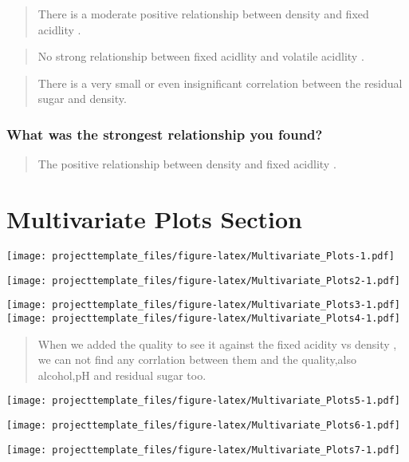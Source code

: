 \documentclass[]{article}
\begin{document}
\begin{quote}
There is a moderate positive relationship between density and fixed
acidlity .
\end{quote}

\begin{quote}
No strong relationship between fixed acidlity and volatile acidlity .
\end{quote}

\begin{quote}
There is a very small or even insignificant correlation between the
residual sugar and density.
\end{quote}

\subsubsection{What was the strongest relationship you
found?}\label{what-was-the-strongest-relationship-you-found}

\begin{quote}
The positive relationship between density and fixed acidlity .
\end{quote}

\section{Multivariate Plots Section}\label{multivariate-plots-section}

\texttt{[image: projecttemplate\_files/figure-latex/Multivariate\_Plots-1.pdf]}

\texttt{[image: projecttemplate\_files/figure-latex/Multivariate\_Plots2-1.pdf]}

\texttt{[image: projecttemplate\_files/figure-latex/Multivariate\_Plots3-1.pdf]}
\texttt{[image: projecttemplate\_files/figure-latex/Multivariate\_Plots4-1.pdf]}

\begin{quote}
When we added the quality to see it against the fixed acidity vs density
, we can not find any corrlation between them and the quality,also
alcohol,pH and residual sugar too.
\end{quote}

\texttt{[image: projecttemplate\_files/figure-latex/Multivariate\_Plots5-1.pdf]}

\texttt{[image: projecttemplate\_files/figure-latex/Multivariate\_Plots6-1.pdf]}

\texttt{[image: projecttemplate\_files/figure-latex/Multivariate\_Plots7-1.pdf]}
\end{document}
